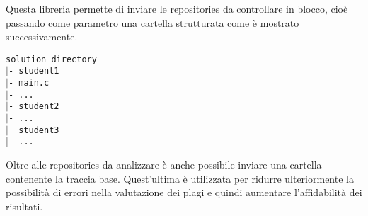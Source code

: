 			Questa libreria permette di inviare le repositories da controllare in blocco, cioè passando come parametro una cartella strutturata come è mostrato successivamente.
			
			\begin{tcolorbox}
				\texttt{\tab solution\_directory\\ 
						\tab $\vert$- student1\\
						\tab[1.5cm] $\vert$- main.c\\
						\tab[1.5cm] $\vert$- ...\\
						\tab $\vert$- student2\\
						\tab[1.5cm] $\vert$- ...\\
						\tab $\vert$\_ student3\\
						\tab[1.5cm] $\vert$- ...
					}
			\end{tcolorbox}
			
			Oltre alle repositories da analizzare è anche possibile inviare una cartella contenente la traccia base. Quest'ultima è utilizzata per ridurre ulteriormente la possibilità di errori nella valutazione dei plagi e quindi aumentare l'affidabilità dei risultati.
	